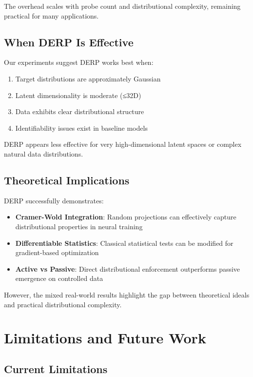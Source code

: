 \documentclass{article}
\begin{document}
The overhead scales with probe count and distributional complexity, remaining practical for many applications.

\subsection{When DERP Is Effective}

Our experiments suggest DERP works best when:
\begin{enumerate}
\item Target distributions are approximately Gaussian
\item Latent dimensionality is moderate (≤32D)  
\item Data exhibits clear distributional structure
\item Identifiability issues exist in baseline models
\end{enumerate}

DERP appears less effective for very high-dimensional latent spaces or complex natural data distributions.

\subsection{Theoretical Implications}

DERP successfully demonstrates:
\begin{itemize}
\item \textbf{Cramer-Wold Integration}: Random projections can effectively capture distributional properties in neural training
\item \textbf{Differentiable Statistics}: Classical statistical tests can be modified for gradient-based optimization
\item \textbf{Active vs Passive}: Direct distributional enforcement outperforms passive emergence on controlled data
\end{itemize}

However, the mixed real-world results highlight the gap between theoretical ideals and practical distributional complexity.

\section{Limitations and Future Work}

\subsection{Current Limitations}
\end{document}
